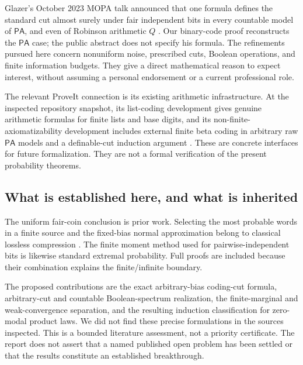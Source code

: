 \documentclass[11pt]{article}
\numberwithin{equation}{section}
\theoremstyle{definition}
\theoremstyle{remark}
\newcommand{\PA}{\mathsf{PA}}
\begin{document}
Glazer's October 2023 MOPA talk announced that one formula defines the
standard cut almost surely under fair independent bits in every countable
model of $\PA$, and even of Robinson arithmetic $Q$ \cite{glazer2023}.
Our binary-code proof reconstructs the $\PA$ case; the public abstract does
not specify his formula. The refinements pursued here concern nonuniform
noise, prescribed cuts, Boolean operations, and finite information budgets.
They give a direct mathematical reason to expect interest, without assuming
a personal endorsement or a current professional role.

The relevant ProveIt connection is its existing arithmetic infrastructure.
At the inspected repository snapshot, its list-coding development gives
genuine arithmetic formulas for finite lists and base digits, and its
non-finite-axiomatizability development includes external finite beta coding
in arbitrary raw $\PA$ models and a definable-cut induction argument
\cite{proveit-list,proveit-finite,proveit-beta,proveit-evaluator}.
These are concrete interfaces for future formalization. They are not a
formal verification of the present probability theorems.

\subsection{What is established here, and what is inherited}

The uniform fair-coin conclusion is prior work. Selecting the most probable
words in a finite source and the fixed-bias normal approximation belong to
classical lossless compression \cite{kontoyiannis-verdu,chen-effros-kostina}.
The finite moment method used for pairwise-independent bits is likewise
standard extremal probability. Full proofs are included because their
combination explains the finite/infinite boundary.

The proposed contributions are the exact arbitrary-bias coding-cut formula,
arbitrary-cut and countable Boolean-spectrum realization, the finite-marginal
and weak-convergence separation, and the resulting induction classification
for zero-modal product laws. We did not find these precise formulations in
the sources inspected. This is a bounded literature assessment, not a
priority certificate. The report does not assert that a named published
open problem has been settled or that the results constitute an established
breakthrough.
\end{document}

